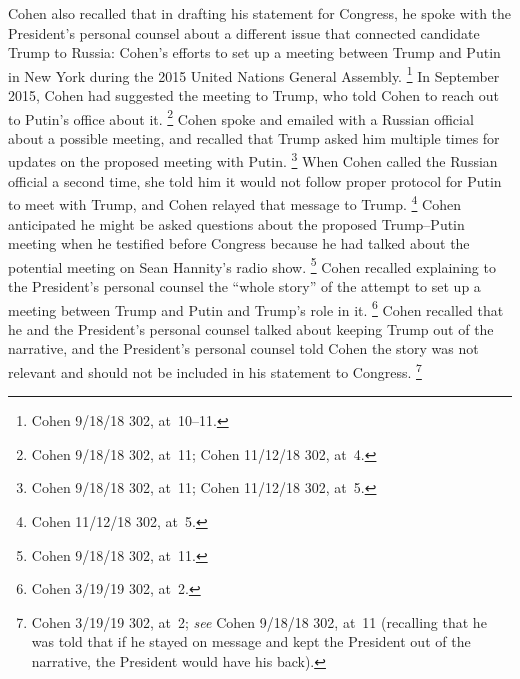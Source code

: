 Cohen also recalled that in drafting his statement for Congress, he spoke with the President's personal counsel about a different issue that connected candidate Trump to Russia: Cohen's efforts to set up a meeting between Trump and Putin in New York during the 2015 United Nations General Assembly.%
\footnote{Cohen 9/18/18 302, at~10--11.}
In September 2015, Cohen had suggested the meeting to Trump, who told Cohen to reach out to Putin's office about it.%
\footnote{Cohen 9/18/18 302, at~11;
Cohen 11/12/18 302, at~4.}
Cohen spoke and emailed with a Russian official about a possible meeting, and recalled that Trump asked him multiple times for updates on the proposed meeting with Putin.%
\footnote{Cohen 9/18/18 302, at~11;
Cohen 11/12/18 302, at~5.}
When Cohen called the Russian official a second time, she told him it would not follow proper protocol for Putin to meet with Trump, and Cohen relayed that message to Trump.%
\footnote{Cohen 11/12/18 302, at~5.}
Cohen anticipated he might be asked questions about the proposed Trump--Putin meeting when he testified before Congress because he had talked about the potential meeting on Sean Hannity's radio show.%
\footnote{Cohen 9/18/18 302, at~11.}
Cohen recalled explaining to the President's personal counsel the ``whole story'' of the attempt to set up a meeting between Trump and Putin and Trump's role in it.%
\footnote{Cohen 3/19/19 302, at~2.}
Cohen recalled that he and the President's personal counsel talked about keeping Trump out of the narrative, and the President's personal counsel told Cohen the story was not relevant and should not be included in his statement to Congress.%
\footnote{Cohen 3/19/19 302, at~2;
\textit{see} Cohen 9/18/18 302, at~11 (recalling that he was told that if he stayed on message and kept the President out of the narrative, the President would have his back).}


